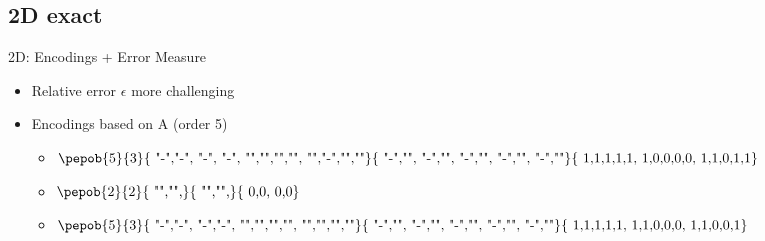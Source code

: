 \subsection{2D exact}

\begin{frame}{2D: Encodings + Error Measure}

    \begin{minipage}{.6\textwidth}
        \begin{itemize}
            \item Relative error $\epsilon$ more challenging
            \item Encodings based on A (order 5)
                  \begin{itemize}
                      \item {}$\vcenter{\hbox{\pepob{5}{3}{{
                                                    "-","-", "-",     "-",
                                                    "","","","",
                                                    "","-","",""}}{{
                                                    "-","",
                                                    "-","",
                                                    "-","",
                                                    "-","",
                                                    "-",""}}{{
                                                    1,1,1,1,1,
                                                    1,0,0,0,0,
                                                    1,1,0,1,1}} }} $
                      \item {}$\vcenter{\hbox{{\pepob{2}{2}{{
                                                            "","",}}{{
                                                            "","",}}{{
                                                            0,0,
                                                            0,0}}} }}$
                      \item {}$\vcenter{\hbox{\pepob{5}{3}{{
                                                    "-","-", "-","-",
                                                    "","","","",
                                                    "","","",""}}{{
                                                    "-","",
                                                    "-","",
                                                    "-","",
                                                    "-","",
                                                    "-",""}}{{
                                                    1,1,1,1,1,
                                                    1,1,0,0,0,
                                                    1,1,0,0,1}} }} $
                  \end{itemize}
        \end{itemize}


\end{minipage}
\end{frame}
